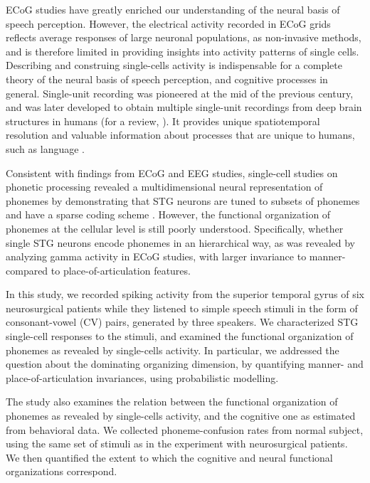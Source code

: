 ECoG studies have greatly enriched our understanding of the neural basis of speech perception.  However, the electrical activity recorded in ECoG grids reflects average responses of large neuronal populations, as non-invasive methods, and is therefore limited in providing insights into activity patterns of single cells. Describing and construing single-cells activity is indispensable for a complete theory of the neural basis of speech perception, and cognitive processes in general. Single-unit recording was pioneered at the mid of the previous century, and was later developed to obtain multiple single-unit recordings from deep brain structures in humans \citep{fried1999cerebral} (for a review, \citealp{engel2005invasive, mukamel2012human, cash2015emergence}). It provides unique spatiotemporal resolution and valuable information about processes that are unique to humans, such as language \citep{heit1988neural, creutzfeldt1989neuronal, tankus2012structured, ossmy2015decoding}.

Consistent with findings from ECoG and EEG studies, single-cell studies on phonetic processing revealed a multidimensional neural representation of phonemes by demonstrating that STG neurons are tuned to subsets of phonemes and have a sparse coding scheme \citep{creutzfeldt1989neuronal, chan2013speech}. However, the functional organization of phonemes at the cellular level is still poorly understood. Specifically, whether single STG neurons encode phonemes in an hierarchical way, as was revealed by analyzing gamma activity in ECoG studies, with larger invariance to manner- compared to place-of-articulation features.

In this study, we recorded spiking activity from the superior temporal gyrus of six neurosurgical patients while they listened to simple speech stimuli in the form of consonant-vowel (CV) pairs, generated by three speakers. We characterized STG single-cell responses to the stimuli, and examined the functional organization of phonemes as revealed by single-cells activity. In particular, we addressed the question about the dominating organizing dimension, by quantifying manner- and place-of-articulation invariances, using probabilistic modelling.

The study also examines the relation between the functional organization of phonemes as revealed by single-cells activity, and the cognitive one as estimated from behavioral data. We collected phoneme-confusion rates from normal subject, using the same set of stimuli as in the experiment with neurosurgical patients. We then quantified the extent to which the cognitive and neural functional organizations correspond. 

